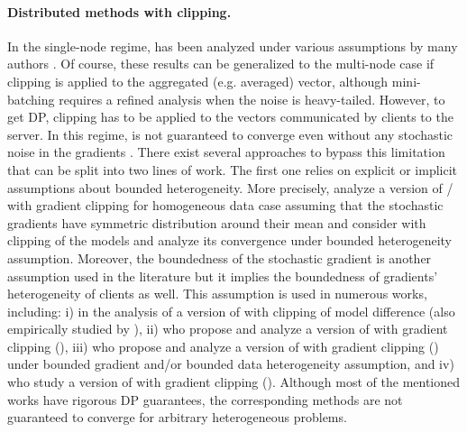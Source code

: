 \paragraph{Distributed methods with clipping.} In  the single-node regime,  has been analyzed under various assumptions by many authors \citep{zhang2020why, zhang2020adaptive, zhang2020improved, gorbunov2020stochastic, cutkosky2021high, sadiev2023high, liu2023high}. Of course, these results can be generalized to the multi-node case if clipping is applied to the aggregated (e.g. averaged) vector, although mini-batching requires a refined analysis when the noise is heavy-tailed\citep{kornilov2024accelerated}. However, to get DP, clipping has to be applied to the vectors communicated by clients to the server. In this regime,  is not guaranteed to converge even without any stochastic noise in the gradients \citep{chen2020understanding, khirirat2023clip21}. There exist several approaches to bypass this limitation that can be split into two lines of work. The first one relies on explicit or implicit assumptions about bounded heterogeneity. More precisely, \citet{liu2022communication} analyze a version of / \citep{mangasarian1995parallel, mcmahan2017communication} with gradient clipping for homogeneous data case assuming that the stochastic gradients have symmetric distribution around their mean and \citet{wei2020federated} consider  with clipping of the models and analyze its convergence under bounded heterogeneity assumption. Moreover, the boundedness of the stochastic gradient is another assumption used in the literature but it implies the boundedness of gradients' heterogeneity of clients as well. This assumption is used in numerous works, including: i) \citet{zhang2022understanding} in the analysis of a version of  with clipping of model difference (also empirically studied by \citet{geyer2017differentially}), ii) \citet{noble2022differentially} who propose and analyze a version of  \citep{karimireddy2020scaffold} with gradient clipping (), iii) \citet{li2023convergence} who propose and analyze a version of  \citep{li2021page} with gradient clipping () under bounded gradient and/or bounded data heterogeneity assumption, and iv) \citet{allouah2024privacy} who study a version of  \citep{nedic2009distributed} with gradient clipping (). Although most of the mentioned works have rigorous DP guarantees, the corresponding methods are not guaranteed to converge for arbitrary heterogeneous problems. 


